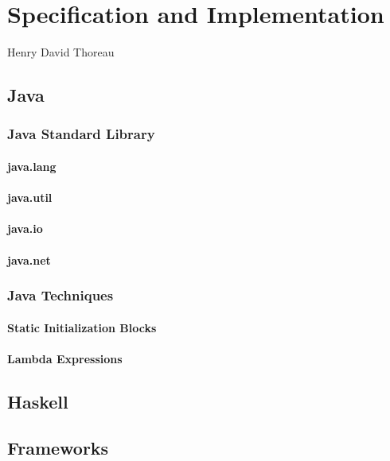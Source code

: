 \chapter{Specification and Implementation}

{Henry David Thoreau}

\section{Java}

\subsection{Java Standard Library}

\subsubsection{java.lang}

\subsubsection{java.util}

\subsubsection{java.io}

\subsubsection{java.net}

\subsection{Java Techniques}

\subsubsection{Static Initialization Blocks}

\subsubsection{Lambda Expressions}

\section{Haskell}

\section{Frameworks}

